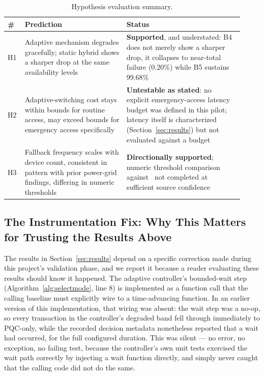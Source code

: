 \documentclass[journal]{IEEEtran}
\begin{document}
\begin{table}[t]
\centering
\caption{Hypothesis evaluation summary.}
\label{tab:hypothesissummary}
\small
\begin{tabular}{@{}p{0.06\linewidth}p{0.40\linewidth}p{0.46\linewidth}@{}}
\toprule
\# & Prediction & Status \\
\midrule
H1 & Adaptive mechanism degrades gracefully; static hybrid shows a sharper drop at the same availability levels & \textbf{Supported}, and understated: B4 does not merely show a sharper drop, it collapses to near-total failure (0.20\%) while B5 sustains 99.68\% \\
H2 & Adaptive-switching cost stays within bounds for routine access, may exceed bounds for emergency access specifically & \textbf{Untestable as stated}: no explicit emergency-access latency budget was defined in this pilot; latency itself is characterized (Section~\ref{sec:results}) but not evaluated against a budget \\
H3 & Fallback frequency scales with device count, consistent in pattern with prior power-grid findings, differing in numeric thresholds & \textbf{Directionally supported}; numeric threshold comparison against~\cite{zhu2025technoeconomic} not completed at sufficient source confidence \\
\bottomrule
\end{tabular}
\end{table}

\subsection{The Instrumentation Fix: Why This Matters for Trusting the Results Above}

The results in Section~\ref{sec:results} depend on a specific correction made during this project's validation phase, and we report it because a reader evaluating these results should know it happened. The adaptive controller's bounded-wait step (Algorithm~\ref{alg:selectmode}, line 8) is implemented as a function call that the calling baseline must explicitly wire to a time-advancing function. In an earlier version of this implementation, that wiring was absent: the wait step was a no-op, so every transaction in the controller's degraded band fell through immediately to PQC-only, while the recorded decision metadata nonetheless reported that a wait had occurred, for the full configured duration. This was silent --- no error, no exception, no failing test, because the controller's own unit tests exercised the wait path correctly by injecting a wait function directly, and simply never caught that the calling code did not do the same.
\end{document}

